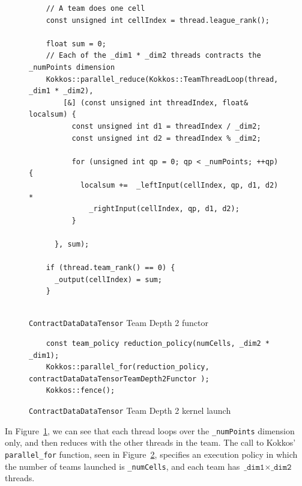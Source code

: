 \begin{figure}[ht]
    \begin{lstlisting}
    // A team does one cell
    const unsigned int cellIndex = thread.league_rank();

    float sum = 0;
    // Each of the _dim1 * _dim2 threads contracts the _numPoints dimension
    Kokkos::parallel_reduce(Kokkos::TeamThreadLoop(thread, _dim1 * _dim2),
        [&] (const unsigned int threadIndex, float& localsum) {
          const unsigned int d1 = threadIndex / _dim2;
          const unsigned int d2 = threadIndex % _dim2;

          for (unsigned int qp = 0; qp < _numPoints; ++qp) {
            localsum +=  _leftInput(cellIndex, qp, d1, d2) *
              _rightInput(cellIndex, qp, d1, d2);
          }

      }, sum);

    if (thread.team_rank() == 0) {
      _output(cellIndex) = sum;
    }
    
 \end{lstlisting}
\caption{\texttt{ContractDataDataTensor} Team Depth 2 functor 
\label{lst:ContractDataDataTensorDepth2Functor}} 
\end{figure}

\begin{figure}[ht]
    \begin{lstlisting}
    const team_policy reduction_policy(numCells, _dim2 * _dim1);
    Kokkos::parallel_for(reduction_policy, contractDataDataTensorTeamDepth2Functor );
    Kokkos::fence();
 \end{lstlisting}
\caption{\texttt{ContractDataDataTensor} Team Depth 2 kernel launch
\label{lst:ContractDataDataTensorDepth2Call}} 
\end{figure}

In Figure~\ref{lst:ContractDataDataTensorDepth2Functor}, we can see that each
thread loops over the \texttt{\_numPoints} dimension only, and then
reduces with the other threads in the team.  The call to Kokkos'
\texttt{parallel\_for} function, seen in
Figure~\ref{lst:ContractDataDataTensorDepth2Call}, specifies an execution policy
in which the number of teams launched is \texttt{\_numCells}, and each team has
$\texttt{\_dim1}\times \texttt{\_dim2}$ threads.

